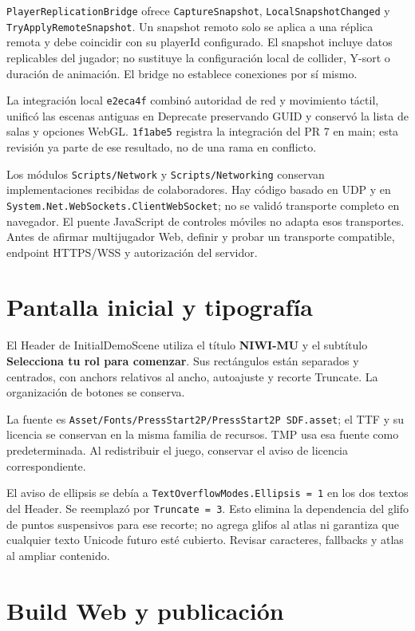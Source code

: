 \documentclass[11pt,letterpaper,oneside]{article}
\newcommand{\code}[1]{\nolinkurl{#1}}
\begin{document}
\code{PlayerReplicationBridge} ofrece \code{CaptureSnapshot}, \code{LocalSnapshotChanged} y \code{TryApplyRemoteSnapshot}. Un snapshot remoto solo se aplica a una réplica remota y debe coincidir con su playerId configurado. El snapshot incluye datos replicables del jugador; no sustituye la configuración local de collider, Y-sort o duración de animación. El bridge no establece conexiones por sí mismo.

La integración local \code{e2eca4f} combinó autoridad de red y movimiento táctil, unificó las escenas antiguas en Deprecate preservando GUID y conservó la lista de salas y opciones WebGL. \code{1f1abe5} registra la integración del PR 7 en main; esta revisión ya parte de ese resultado, no de una rama en conflicto.

Los módulos \code{Scripts/Network} y \code{Scripts/Networking} conservan implementaciones recibidas de colaboradores. Hay código basado en UDP y en \code{System.Net.WebSockets.ClientWebSocket}; no se validó transporte completo en navegador. El puente JavaScript de controles móviles no adapta esos transportes. Antes de afirmar multijugador Web, definir y probar un transporte compatible, endpoint HTTPS/WSS y autorización del servidor.

\section{Pantalla inicial y tipografía}
El Header de InitialDemoScene utiliza el título \textbf{NIWI-MU} y el subtítulo \textbf{Selecciona tu rol para comenzar}. Sus rectángulos están separados y centrados, con anchors relativos al ancho, autoajuste y recorte Truncate. La organización de botones se conserva.

La fuente es \code{Asset/Fonts/PressStart2P/PressStart2P SDF.asset}; el TTF y su licencia se conservan en la misma familia de recursos. TMP usa esa fuente como predeterminada. Al redistribuir el juego, conservar el aviso de licencia correspondiente.

El aviso de ellipsis se debía a \code{TextOverflowModes.Ellipsis = 1} en los dos textos del Header. Se reemplazó por \code{Truncate = 3}. Esto elimina la dependencia del glifo de puntos suspensivos para ese recorte; no agrega glifos al atlas ni garantiza que cualquier texto Unicode futuro esté cubierto. Revisar caracteres, fallbacks y atlas al ampliar contenido.

\section{Build Web y publicación}
\end{document}
